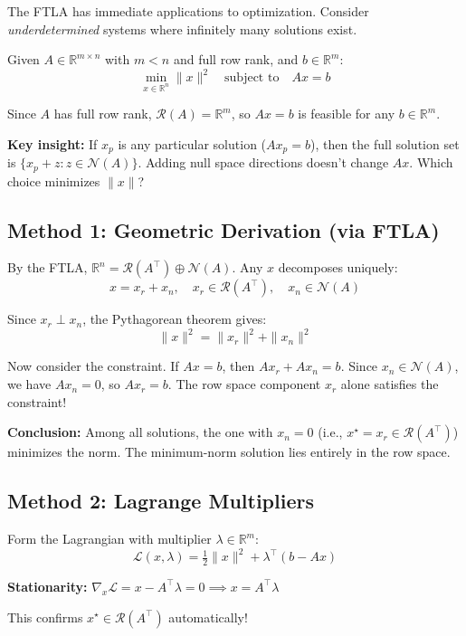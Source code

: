 \documentclass[10pt, twocolumn]{article}
\theoremstyle{definition}
\theoremstyle{plain}
\newcommand{\RR}{\mathbb{R}}
\newcommand{\NN}{\mathcal{N}}
\newcommand{\Range}{\mathcal{R}}
\begin{document}
The FTLA has immediate applications to optimization. Consider \emph{underdetermined} systems where infinitely many solutions exist.

\begin{tcolorbox}[colframe=black!50, title={\small Problem: Minimum-Norm Solution}]
Given $A \in \RR^{m \times n}$ with $m < n$ and full row rank, and $b \in \RR^m$:
\[
    \min_{x \in \RR^n} \|x\|^2 \quad \text{subject to} \quad Ax = b
\]
\end{tcolorbox}

Since $A$ has full row rank, $\Range(A) = \RR^m$, so $Ax = b$ is feasible for any $b \in \RR^m$.

\textbf{Key insight:} If $x_p$ is any particular solution ($Ax_p = b$), then the full solution set is $\{x_p + z : z \in \NN(A)\}$. Adding null space directions doesn't change $Ax$. Which choice minimizes $\|x\|$?

\subsection{Method 1: Geometric Derivation (via FTLA)}

By the FTLA, $\RR^n = \Range(A^\top) \oplus \NN(A)$. Any $x$ decomposes uniquely:
\[
    x = x_r + x_n, \quad x_r \in \Range(A^\top), \quad x_n \in \NN(A)
\]

Since $x_r \perp x_n$, the Pythagorean theorem gives:
\[
    \|x\|^2 = \|x_r\|^2 + \|x_n\|^2
\]

Now consider the constraint. If $Ax = b$, then $Ax_r + Ax_n = b$. Since $x_n \in \NN(A)$, we have $Ax_n = 0$, so $Ax_r = b$. The row space component $x_r$ alone satisfies the constraint!

\textbf{Conclusion:} Among all solutions, the one with $x_n = 0$ (i.e., $x^\star = x_r \in \Range(A^\top)$) minimizes the norm. The minimum-norm solution lies entirely in the row space.

\subsection{Method 2: Lagrange Multipliers}

Form the Lagrangian with multiplier $\lambda \in \RR^m$:
\[
    \mathcal{L}(x, \lambda) = \tfrac{1}{2}\|x\|^2 + \lambda^\top(b - Ax)
\]

\textbf{Stationarity:} $\nabla_x \mathcal{L} = x - A^\top \lambda = 0 \implies x = A^\top \lambda$

This confirms $x^\star \in \Range(A^\top)$ automatically!
\end{document}
